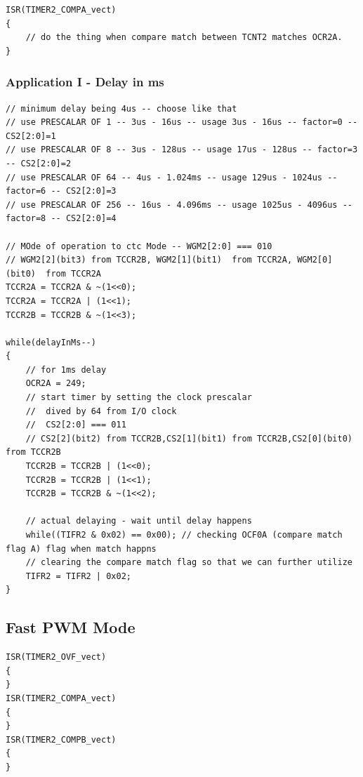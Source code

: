\documentclass{article}
\begin{document}
\begin{verbatim}
ISR(TIMER2_COMPA_vect)
{
    // do the thing when compare match between TCNT2 matches OCR2A.
}
\end{verbatim}



\subsubsection{Application I - Delay in ms}

\begin{verbatim}
// minimum delay being 4us -- choose like that
// use PRESCALAR OF 1 -- 3us - 16us -- usage 3us - 16us -- factor=0 -- CS2[2:0]=1
// use PRESCALAR OF 8 -- 3us - 128us -- usage 17us - 128us -- factor=3 -- CS2[2:0]=2
// use PRESCALAR OF 64 -- 4us - 1.024ms -- usage 129us - 1024us -- factor=6 -- CS2[2:0]=3
// use PRESCALAR OF 256 -- 16us - 4.096ms -- usage 1025us - 4096us -- factor=8 -- CS2[2:0]=4
    
// MOde of operation to ctc Mode -- WGM2[2:0] === 010
// WGM2[2](bit3) from TCCR2B, WGM2[1](bit1)  from TCCR2A, WGM2[0](bit0)  from TCCR2A
TCCR2A = TCCR2A & ~(1<<0);
TCCR2A = TCCR2A | (1<<1);
TCCR2B = TCCR2B & ~(1<<3);

while(delayInMs--)
{
    // for 1ms delay
    OCR2A = 249;
    // start timer by setting the clock prescalar
    //  dived by 64 from I/O clock
    //  CS2[2:0] === 011
    // CS2[2](bit2) from TCCR2B,CS2[1](bit1) from TCCR2B,CS2[0](bit0) from TCCR2B
    TCCR2B = TCCR2B | (1<<0);
    TCCR2B = TCCR2B | (1<<1);
    TCCR2B = TCCR2B & ~(1<<2);

    // actual delaying - wait until delay happens
    while((TIFR2 & 0x02) == 0x00); // checking OCF0A (compare match flag A) flag when match happns
    // clearing the compare match flag so that we can further utilize
    TIFR2 = TIFR2 | 0x02;
}
\end{verbatim}

\subsection{Fast PWM Mode}
\begin{verbatim}
ISR(TIMER2_OVF_vect)
{
} 
ISR(TIMER2_COMPA_vect)
{
}
ISR(TIMER2_COMPB_vect)
{
}
\end{verbatim}
\end{document}
